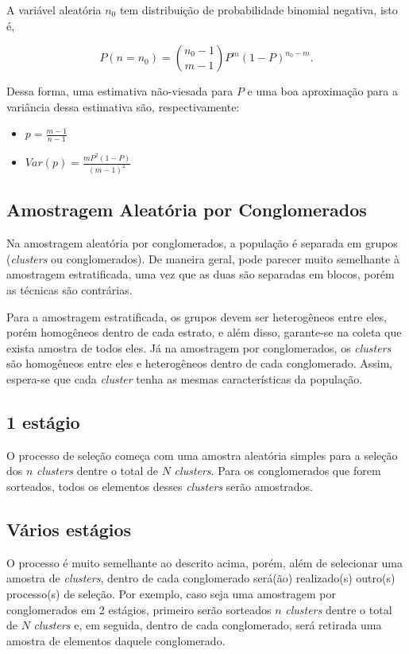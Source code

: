 \documentclass[
]{estat/estat}
\providecommand{\tightlist}{%
  \setlength{\itemsep}{0pt}\setlength{\parskip}{0pt}}\usepackage{longtable,booktabs,array}
\begin{document}
A variável aleatória \(n_0\) tem distribuição de probabilidade binomial
negativa, isto é,

\[
P(n=n_0) = {n_0-1 \choose m-1} P^m (1-P)^{n_0-m}.
\]

Dessa forma, uma estimativa não-viesada para \(P\) e uma boa aproximação
para a variância dessa estimativa são, respectivamente:

\begin{itemize}
\tightlist
\item
  \(p = \frac{m-1}{n-1}\)
\item
  \(Var(p) = \frac{m P^2 (1-P)}{(m-1)^2}\)
\end{itemize}

\subsection{Amostragem Aleatória por
Conglomerados}\label{amostragem-aleatuxf3ria-por-conglomerados}

Na amostragem aleatória por conglomerados, a população é separada em
grupos (\emph{clusters} ou conglomerados). De maneira geral, pode
parecer muito semelhante à amostragem estratificada, uma vez que as duas
são separadas em blocos, porém as técnicas são contrárias.

Para a amostragem estratificada, os grupos devem ser heterogêneos entre
eles, porém homogêneos dentro de cada estrato, e além disso, garante-se
na coleta que exista amostra de todos eles. Já na amostragem por
conglomerados, os \emph{clusters} são homogêneos entre eles e
heterogêneos dentro de cada conglomerado. Assim, espera-se que cada
\emph{cluster} tenha as mesmas características da população.

\subsection{1 estágio}\label{estuxe1gio}

O processo de seleção começa com uma amostra aleatória simples para a
seleção dos \(n\) \emph{clusters} dentre o total de \(N\)
\emph{clusters}. Para os conglomerados que forem sorteados, todos os
elementos desses \emph{clusters} serão amostrados.

\subsection{Vários estágios}\label{vuxe1rios-estuxe1gios}

O processo é muito semelhante ao descrito acima, porém, além de
selecionar uma amostra de \emph{clusters}, dentro de cada conglomerado
será(ão) realizado(s) outro(s) processo(s) de seleção. Por exemplo, caso
seja uma amostragem por conglomerados em 2 estágios, primeiro serão
sorteados \(n\) \emph{clusters} dentre o total de \(N\) \emph{clusters}
e, em seguida, dentro de cada conglomerado, será retirada uma amostra de
elementos daquele conglomerado.
\end{document}

